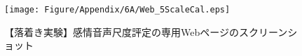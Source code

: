 \begin{figure}[h]
  \vspace{10pt}
  \centering
  \texttt{[image: Figure/Appendix/6A/Web\_5ScaleCal.eps]}
  \caption{
    【落着き実験】感情音声尺度評定の専用Webページのスクリーンショット
    }
  \label{fig:Web_5ScaleCal}
\end{figure}
















  
  
  





